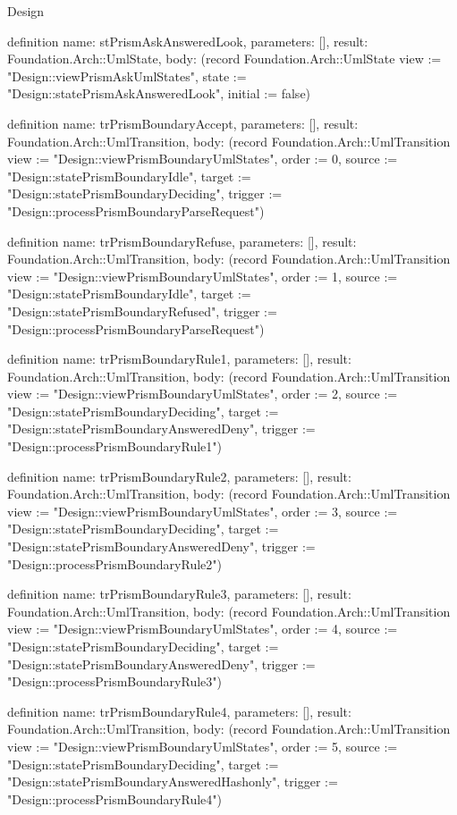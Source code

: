 \begin{lexlean}{Design}
\begin{semanticmodule}
definition{
  name: stPrismAskAnsweredLook,
  parameters: [],
  result: Foundation.Arch::UmlState,
  body: (record Foundation.Arch::UmlState {view := "Design::viewPrismAskUmlStates", state := "Design::statePrismAskAnsweredLook", initial := false})
}

definition{
  name: trPrismBoundaryAccept,
  parameters: [],
  result: Foundation.Arch::UmlTransition,
  body: (record Foundation.Arch::UmlTransition {view := "Design::viewPrismBoundaryUmlStates", order := 0, source := "Design::statePrismBoundaryIdle", target := "Design::statePrismBoundaryDeciding", trigger := "Design::processPrismBoundaryParseRequest"})
}

definition{
  name: trPrismBoundaryRefuse,
  parameters: [],
  result: Foundation.Arch::UmlTransition,
  body: (record Foundation.Arch::UmlTransition {view := "Design::viewPrismBoundaryUmlStates", order := 1, source := "Design::statePrismBoundaryIdle", target := "Design::statePrismBoundaryRefused", trigger := "Design::processPrismBoundaryParseRequest"})
}

definition{
  name: trPrismBoundaryRule1,
  parameters: [],
  result: Foundation.Arch::UmlTransition,
  body: (record Foundation.Arch::UmlTransition {view := "Design::viewPrismBoundaryUmlStates", order := 2, source := "Design::statePrismBoundaryDeciding", target := "Design::statePrismBoundaryAnsweredDeny", trigger := "Design::processPrismBoundaryRule1"})
}

definition{
  name: trPrismBoundaryRule2,
  parameters: [],
  result: Foundation.Arch::UmlTransition,
  body: (record Foundation.Arch::UmlTransition {view := "Design::viewPrismBoundaryUmlStates", order := 3, source := "Design::statePrismBoundaryDeciding", target := "Design::statePrismBoundaryAnsweredDeny", trigger := "Design::processPrismBoundaryRule2"})
}

definition{
  name: trPrismBoundaryRule3,
  parameters: [],
  result: Foundation.Arch::UmlTransition,
  body: (record Foundation.Arch::UmlTransition {view := "Design::viewPrismBoundaryUmlStates", order := 4, source := "Design::statePrismBoundaryDeciding", target := "Design::statePrismBoundaryAnsweredDeny", trigger := "Design::processPrismBoundaryRule3"})
}

definition{
  name: trPrismBoundaryRule4,
  parameters: [],
  result: Foundation.Arch::UmlTransition,
  body: (record Foundation.Arch::UmlTransition {view := "Design::viewPrismBoundaryUmlStates", order := 5, source := "Design::statePrismBoundaryDeciding", target := "Design::statePrismBoundaryAnsweredHashonly", trigger := "Design::processPrismBoundaryRule4"})
}


\end{semanticmodule}
\end{lexlean}
